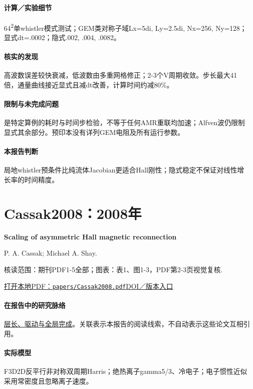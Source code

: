 \documentclass[UTF8,a4paper,11pt,openany,fontset=fandol]{ctexbook}
\begin{document}
\paragraph{计算／实验细节}64\textsuperscript{2}单whistler模式测试；GEM类对称子域Lx=5di, Ly=2.5di, Nx=256, Ny=128；显式dt=.0002；隐式.002, .004, .0082。

\paragraph{核实的发现}高波数误差较快衰减，低波数由多重网格修正；2-3个V周期收敛。步长最大41倍，通量曲线接近显式且减dt改善，计算时间约减80\%。

\paragraph{限制与未完成问题}是特定算例的耗时与时间步检验，不等于任何AMR重联均加速；Alfven波仍限制显式其余部分。预印本没有详列GEM电阻及所有运行参数。

\paragraph{本报告判断}局地whistler预条件比纯流体Jacobian更适合Hall刚性；隐式稳定不保证对线性增长率的时间精度。

\section{Cassak2008：2008年}\label{paper:Cassak2008}

\textbf{Scaling of asymmetric Hall magnetic reconnection}\citep{Cassak2008}\

P. A. Cassak;  Michael A. Shay.

\textsf{核读范围：}期刊PDF1-5全部；\textsf{图表：}表1、图1-3，PDF第2-3页视觉复核.

\href{run:../papers/Cassak2008.pdf}{打开本地PDF：\texttt{papers/Cassak2008.pdf}}\quad\href{https://doi.org/10.1029/2008gl035268}{DOI／版本入口}

\paragraph{在报告中的研究脉络}\hyperref[story:global]{层长、驱动与全局完成}。关联表示本报告的阅读线索，不自动表示这些论文互相引用。

\paragraph{实际模型}F3D2D反平行非对称双周期Harris；绝热离子gamma5/3、冷电子；电子惯性近似采用常密度且忽略离子速度。
\end{document}

